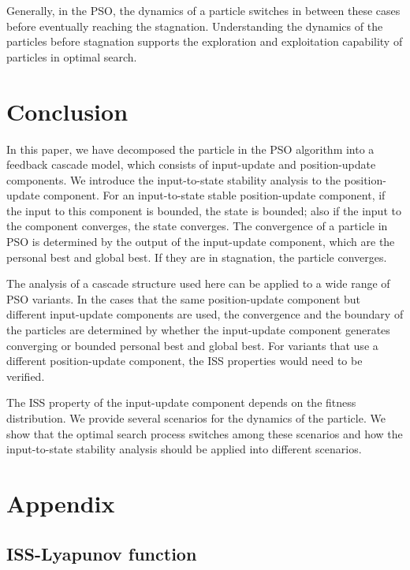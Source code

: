\documentclass{sig-alternate}
\begin{document}
Generally, in the PSO, the dynamics of a particle switches in between these cases before eventually reaching the stagnation.
Understanding the dynamics of the particles before stagnation supports the exploration and exploitation capability of particles in optimal search.

\section{Conclusion}
\label{sec:conclusion}

In this paper, we have decomposed the particle in the PSO algorithm into a feedback cascade model, which consists of input-update and position-update components.
We introduce the input-to-state stability analysis to the position-update component.
For an input-to-state stable position-update component, if the input to this component is bounded, the state is bounded; also if the input to the component converges, the state converges.
The convergence of a particle in PSO is determined by the output of the input-update component, which are the personal best and global best.
If they are in stagnation, the particle converges.

The analysis of a cascade structure used here can be applied to a wide range of PSO variants.
In the cases that the same position-update component but different input-update components are used, the convergence and the boundary of the particles are determined by whether the input-update component generates converging or bounded personal best and global best.
For variants that use a different position-update component, the ISS properties would need to be verified.

The ISS property of the input-update component depends on the fitness distribution.
We provide several scenarios for the dynamics of the particle.
We show that the optimal search process switches among these scenarios and how the input-to-state stability analysis should be applied into different scenarios.

\section*{Appendix}
\label{sec:appendix}

\subsection{ISS-Lyapunov function}
\label{sec:iss_lyapunov:func}
\end{document}
